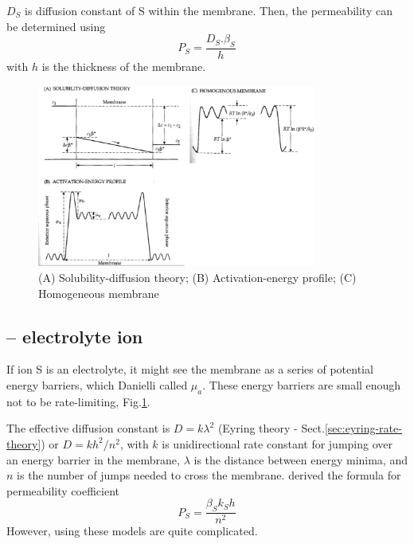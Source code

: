 $D_S$ is diffusion constant of S within the membrane. Then, the permeability can be determined using
\begin{equation}
P_S = \frac{D_S.\beta_S}{h}
\end{equation}
with $h$ is the thickness of the membrane.


\begin{figure}[hbt]
  \centerline{\includegraphics[height=6cm,
    angle=0]{./images/theory_permeability.eps}}
  \caption{(A) Solubility-diffusion theory; (B) Activation-energy profile; (C)
  Homogeneous membrane}
\label{fig:theory_permeability}
\end{figure}

\subsection{-- electrolyte ion}
\label{sec:permeability-electrolyte-ion}

If ion S is an electrolyte, it might see the membrane as a series of
potential energy barriers, which Danielli called $\mu_a$. These energy barriers
are small enough not to be rate-limiting, Fig.\ref{fig:theory_permeability}.

The effective diffusion constant is $D=k\lambda^2$ (Eyring theory -
Sect.\ref{sec:eyring-rate-theory}) or $D=k h^2/n^2$, with $k$ is unidirectional
rate constant for jumping over an energy barrier in the membrane, $\lambda$ is
the distance between energy minima, and $n$ is the number of jumps needed to
cross the membrane. \citep{woodbury1971} derived the formula for permeability
coefficient
\begin{equation}
P_S = \frac{\beta_S k_S h}{n^2}
\end{equation}
However, using these models are quite complicated.


